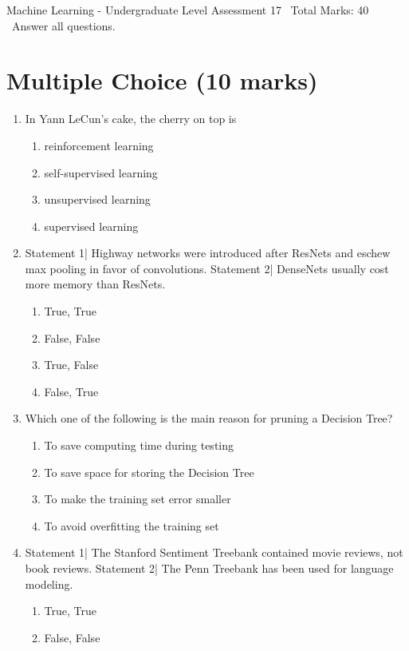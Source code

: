 \documentclass[12pt]{article}
\begin{document}
\begin{center}
Machine Learning - Undergraduate Level Assessment 17 \
Total Marks: 40 \
Answer all questions.
\end{center}

\section*{Multiple Choice (10 marks)}
\begin{enumerate}[label=\arabic*.]
\item In Yann LeCun's cake, the cherry on top is
\begin{enumerate}[label=(\alph*)]
    \item reinforcement learning
    \item self-supervised learning
    \item unsupervised learning
    \item supervised learning
\end{enumerate}
\item Statement 1| Highway networks were introduced after ResNets and eschew max pooling in favor of convolutions. Statement 2| DenseNets usually cost more memory than ResNets.
\begin{enumerate}[label=(\alph*)]
    \item True, True
    \item False, False
    \item True, False
    \item False, True
\end{enumerate}
\item Which one of the following is the main reason for pruning a Decision Tree?
\begin{enumerate}[label=(\alph*)]
    \item To save computing time during testing
    \item To save space for storing the Decision Tree
    \item To make the training set error smaller
    \item To avoid overfitting the training set
\end{enumerate}
\item Statement 1| The Stanford Sentiment Treebank contained movie reviews, not book reviews. Statement 2| The Penn Treebank has been used for language modeling.
\begin{enumerate}[label=(\alph*)]
    \item True, True
    \item False, False

\end{enumerate}
\end{enumerate}
\end{document}
